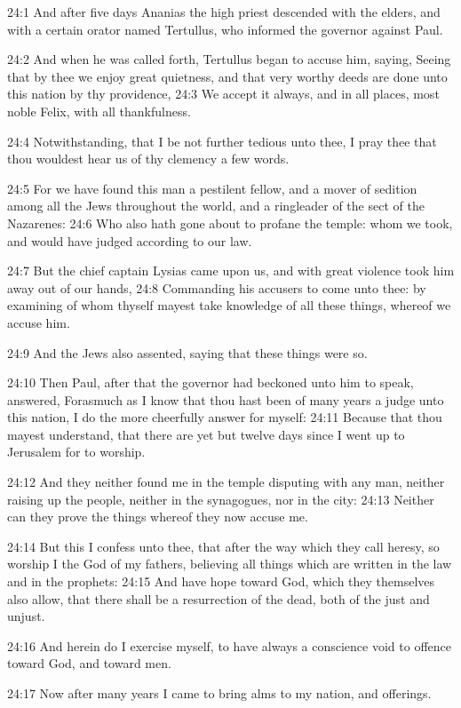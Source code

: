 24:1 And after five days Ananias the high priest descended with the
elders, and with a certain orator named Tertullus, who informed the
governor against Paul.

24:2 And when he was called forth, Tertullus began to accuse him,
saying, Seeing that by thee we enjoy great quietness, and that very
worthy deeds are done unto this nation by thy providence, 24:3 We
accept it always, and in all places, most noble Felix, with all
thankfulness.

24:4 Notwithstanding, that I be not further tedious unto thee, I pray
thee that thou wouldest hear us of thy clemency a few words.

24:5 For we have found this man a pestilent fellow, and a mover of
sedition among all the Jews throughout the world, and a ringleader of
the sect of the Nazarenes: 24:6 Who also hath gone about to profane
the temple: whom we took, and would have judged according to our law.

24:7 But the chief captain Lysias came upon us, and with great
violence took him away out of our hands, 24:8 Commanding his accusers
to come unto thee: by examining of whom thyself mayest take knowledge
of all these things, whereof we accuse him.

24:9 And the Jews also assented, saying that these things were so.

24:10 Then Paul, after that the governor had beckoned unto him to
speak, answered, Forasmuch as I know that thou hast been of many years
a judge unto this nation, I do the more cheerfully answer for myself:
24:11 Because that thou mayest understand, that there are yet but
twelve days since I went up to Jerusalem for to worship.

24:12 And they neither found me in the temple disputing with any man,
neither raising up the people, neither in the synagogues, nor in the
city: 24:13 Neither can they prove the things whereof they now accuse
me.

24:14 But this I confess unto thee, that after the way which they call
heresy, so worship I the God of my fathers, believing all things which
are written in the law and in the prophets: 24:15 And have hope toward
God, which they themselves also allow, that there shall be a
resurrection of the dead, both of the just and unjust.

24:16 And herein do I exercise myself, to have always a conscience
void to offence toward God, and toward men.

24:17 Now after many years I came to bring alms to my nation, and
offerings.

